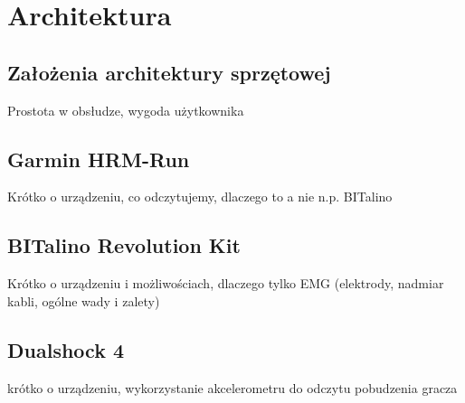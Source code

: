 \chapter{Architektura}
\label{cha:architektura}
\section{Założenia architektury sprzętowej}
Prostota w obsłudze, wygoda użytkownika
\section{Garmin HRM-Run}
Krótko o urządzeniu, co odczytujemy, dlaczego to a nie n.p. BITalino
\section{BITalino Revolution Kit}
Krótko o urządzeniu i możliwościach, dlaczego tylko EMG (elektrody, nadmiar kabli, ogólne wady i zalety)
\section{Dualshock 4}
krótko o urządzeniu, wykorzystanie akcelerometru do odczytu pobudzenia gracza
